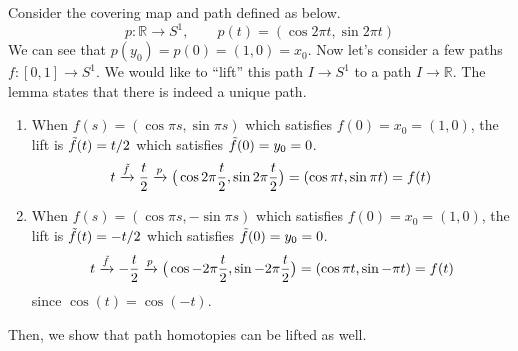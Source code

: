   \begin{example}
    \label{ex:lift-of-real-interval-to-s1}
    Consider the covering map and path defined as below. 
    \begin{equation}
      p: \mathbb{R} \to S^1, \qquad p(t) = (\cos{2 \pi t}, \sin{2 \pi t}) 
    \end{equation}
    We can see that $p(y_0) = p(0) = (1, 0) = x_0$. Now let's consider a few paths $f: [0, 1] \to S^1$. We would like to ``lift'' this path $I \to S^1$ to a path $I \to \mathbb{R}$. The lemma states that there is indeed a unique path. 
    \begin{enumerate}
      \item When $f(s) = (\cos{\pi s}, \sin{\pi s})$ which satisfies $f(0) = x_0 = (1, 0)$, the lift is $\Tilde{f}(t) = t/2$ which satisfies $\Tilde{f}(0) = y_0 = 0$. 
      \begin{equation}
        t \xrightarrow{\Tilde{f}} \frac{t}{2} \xrightarrow{p} \big( \cos{2 \pi \frac{t}{2}}, \sin{2 \pi \frac{t}{2}} \big) = ( \cos{\pi t}, \sin{\pi t}) = f(t)
      \end{equation}

      \item When $f(s) = (\cos{\pi s}, -\sin{\pi s})$ which satisfies $f(0) = x_0 = (1, 0)$, the lift is $\Tilde{f}(t) = -t/2$ which satisfies $\Tilde{f}(0) = y_0 = 0$. 
      \begin{equation}
        t \xrightarrow{\Tilde{f}} -\frac{t}{2} \xrightarrow{p} \big( \cos{-2 \pi \frac{t}{2}}, \sin{-2 \pi \frac{t}{2}} \big) = ( \cos{\pi t}, \sin{-\pi t}) = f(t)
      \end{equation}
      since $\cos(t) = \cos(-t)$. 
    \end{enumerate}

    \begin{figure}[H]
      \centering 
      \caption{} 
      \label{fig:lift_ex}
    \end{figure}
  \end{example}

  Then, we show that path homotopies can be lifted as well. 

